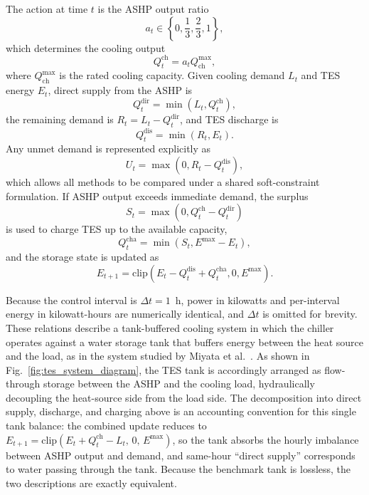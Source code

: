 \documentclass[11pt]{article}
\begin{document}
The action at time $t$ is the ASHP output ratio
\begin{equation}
a_t \in \left\{0,\frac{1}{3},\frac{2}{3},1\right\},
\end{equation}
which determines the cooling output
\begin{equation}
Q_t^{\mathrm{ch}} = a_t Q^{\max}_{\mathrm{ch}},
\end{equation}
where $Q^{\max}_{\mathrm{ch}}$ is the rated cooling capacity. Given cooling demand $L_t$ and TES energy $E_t$, direct supply from the ASHP is
\begin{equation}
Q_t^{\mathrm{dir}}=\min(L_t,Q_t^{\mathrm{ch}}),
\end{equation}
the remaining demand is $R_t=L_t-Q_t^{\mathrm{dir}}$, and TES discharge is
\begin{equation}
Q_t^{\mathrm{dis}}=\min(R_t,E_t).
\end{equation}
Any unmet demand is represented explicitly as
\begin{equation}
U_t=\max(0,R_t-Q_t^{\mathrm{dis}}),
\end{equation}
which allows all methods to be compared under a shared soft-constraint formulation. If ASHP output exceeds immediate demand, the surplus
\begin{equation}
S_t=\max(0,Q_t^{\mathrm{ch}}-Q_t^{\mathrm{dir}})
\end{equation}
is used to charge TES up to the available capacity,
\begin{equation}
Q_t^{\mathrm{cha}}=\min(S_t,E^{\max}-E_t),
\end{equation}
and the storage state is updated as
\begin{equation}
E_{t+1}=\mathrm{clip}\left(E_t-Q_t^{\mathrm{dis}}+Q_t^{\mathrm{cha}},0,E^{\max}\right).
\end{equation}

Because the control interval is $\Delta t=1$~h, power in kilowatts and per-interval energy in kilowatt-hours are numerically identical, and $\Delta t$ is omitted for brevity. These relations describe a tank-buffered cooling system in which the chiller operates against a water storage tank that buffers energy between the heat source and the load, as in the system studied by Miyata et al.~\cite{miyata2020_dynamic_co2_mpc}. As shown in Fig.~\ref{fig:tes_system_diagram}, the TES tank is accordingly arranged as flow-through storage between the ASHP and the cooling load, hydraulically decoupling the heat-source side from the load side. The decomposition into direct supply, discharge, and charging above is an accounting convention for this single tank balance: the combined update reduces to $E_{t+1}=\mathrm{clip}\left(E_t+Q_t^{\mathrm{ch}}-L_t,\,0,\,E^{\max}\right)$, so the tank absorbs the hourly imbalance between ASHP output and demand, and same-hour ``direct supply'' corresponds to water passing through the tank. Because the benchmark tank is lossless, the two descriptions are exactly equivalent.
\end{document}
